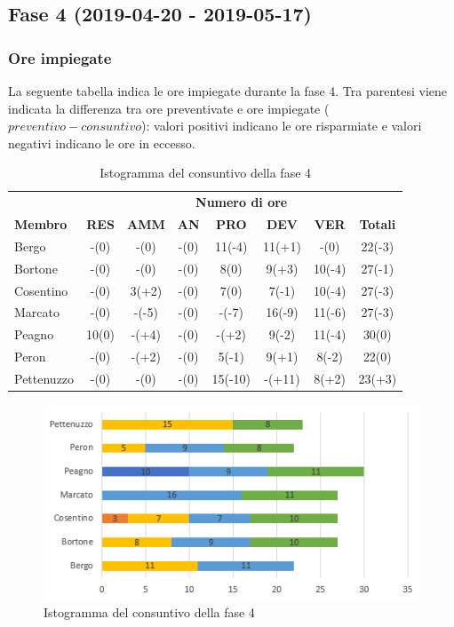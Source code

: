 \newpage
\subsection{Fase 4 (2019-04-20 - 2019-05-17)}
	\subsubsection{Ore impiegate}
	La seguente tabella indica le ore impiegate durante la fase 4. Tra parentesi viene indicata la differenza tra ore preventivate e ore impiegate ($preventivo - consuntivo$): valori positivi indicano le ore risparmiate e valori negativi indicano le ore in eccesso.
	
	\begin{table}[H]
		\centering
		\begin{tabular}{| l | c c c c c c | c |}
			\rowcolor{LightBlue}
			& \multicolumn{7}{c}{\textbf{\color{white}Numero di ore}}	\\
			
			\rowcolor{LightBlue}
			\textbf{\color{white}Membro}
			& \textbf{\color{white}RES}
			& \textbf{\color{white}AMM}
			& \textbf{\color{white}AN}
			& \textbf{\color{white}PRO}
			& \textbf{\color{white}DEV}
			& \textbf{\color{white}VER}
			& \textbf{\color{white}Totali}\\
			Bergo & -(0) & -(0) & -(0) & 11(-4) & 11(+1) & -(0) & 22(-3)\\
			Bortone & -(0) & -(0) & -(0) & 8(0) & 9(+3) & 10(-4) & 27(-1)\\
			Cosentino & -(0) & 3(+2) & -(0) & 7(0) & 7(-1) & 10(-4) & 27(-3)\\
			Marcato  & -(0) & -(-5) & -(0) & -(-7) & 16(-9) & 11(-6) & 27(-3)\\
			Peagno & 10(0) & -(+4) & -(0) & -(+2) & 9(-2) & 11(-4) & 30(0)\\
			Peron   & -(0) & -(+2) & -(0) & 5(-1) & 9(+1) &  8(-2)	& 22(0)\\
			Pettenuzzo & -(0) & -(0) & -(0) & 15(-10) & -(+11) & 8(+2) & 23(+3)\\ \hline
		\end{tabular}
		\caption{Ore di lavoro impiegate per membro/ruolo della fase 4}
		
		\begin{figure}[H]
			\centering
			\includegraphics[scale=1]{images/consuntivoRA.png}
			\caption{Istogramma del consuntivo della fase 4}
		\end{figure}
	\end{table}
	
